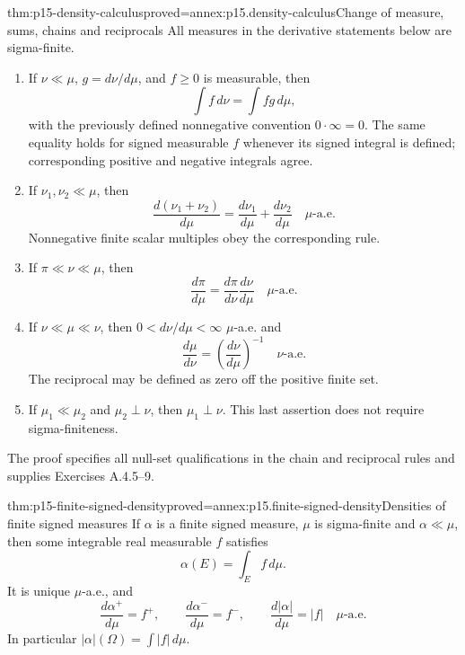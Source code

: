 \begin{hbtheorem}{thm:p15-density-calculus}{proved=annex:p15.density-calculus}{Change of measure, sums, chains and reciprocals}
All measures in the derivative statements below are sigma-finite.
\begin{enumerate}
\item If \(\nu\ll\mu\), \(g=d\nu/d\mu\), and \(f\geq0\) is measurable, then
      \[
                        \int f\,d\nu=\int fg\,d\mu,
      \]
      with the previously defined nonnegative convention \(0\cdot\infty=0\).
      The same equality holds for signed measurable \(f\) whenever its signed
      integral is defined; corresponding positive and negative integrals agree.
\item If \(\nu_1,\nu_2\ll\mu\), then
      \[
               \frac{d(\nu_1+\nu_2)}{d\mu}
                  =\frac{d\nu_1}{d\mu}+\frac{d\nu_2}{d\mu}
                          \quad\mu\text{-a.e.}
      \]
      Nonnegative finite scalar multiples obey the corresponding rule.
\item If \(\pi\ll\nu\ll\mu\), then
      \[
                  \frac{d\pi}{d\mu}
                    =\frac{d\pi}{d\nu}\frac{d\nu}{d\mu}
                         \quad\mu\text{-a.e.}
      \]
\item If \(\nu\ll\mu\ll\nu\), then \(0<d\nu/d\mu<\infty\)
      \(\mu\)-a.e. and
      \[
                 \frac{d\mu}{d\nu}=\left(\frac{d\nu}{d\mu}\right)^{-1}
                         \quad\nu\text{-a.e.}
      \]
      The reciprocal may be defined as zero off the positive finite set.
\item If \(\mu_1\ll\mu_2\) and \(\mu_2\perp\nu\), then \(\mu_1\perp\nu\).
      This last assertion does not require sigma-finiteness.
\end{enumerate}
The proof specifies all null-set qualifications in the chain and reciprocal
rules and supplies Exercises A.4.5--9.
\end{hbtheorem}

\begin{hbcorollary}{thm:p15-finite-signed-density}{proved=annex:p15.finite-signed-density}{Densities of finite signed measures}
If \(\alpha\) is a finite signed measure, \(\mu\) is sigma-finite and
\(\alpha\ll\mu\), then some integrable real measurable \(f\) satisfies
\[
                            \alpha(E)=\int_E f\,d\mu.
\]
It is unique \(\mu\)-a.e., and
\[
        \frac{d\alpha^+}{d\mu}=f^+,\qquad
        \frac{d\alpha^-}{d\mu}=f^-,\qquad
        \frac{d\lvert\alpha\rvert}{d\mu}=|f|\quad\mu\text{-a.e.}
\]
In particular \(\lvert\alpha\rvert(\Omega)=\int|f|\,d\mu\).
\end{hbcorollary}

